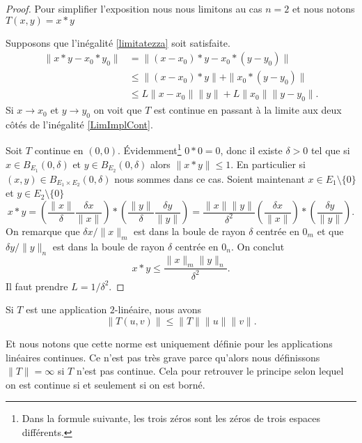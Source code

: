 \begin{proof}
	Pour simplifier l'exposition nous nous limitons au cas \( n=2\) et nous notons \( T(x,y)=x*y\)

	Supposons que l'inégalité \eqref{limitatezza} soit satisfaite.
	\begin{equation}\label{LimImplCont}
		\begin{aligned}
			\|x*y-x_0*y_0\| & =\|(x-x_0)*y-x_0*(y-y_0)\|                \\
			                & \leq \|(x-x_0)*y\|+\|x_0*(y-y_0)\|        \\
			                & \leq L\|x-x_0\|\|y\| + L\|x_0\|\|y-y_0\|.
		\end{aligned}
	\end{equation}
	Si \( x\to x_0\) et \( y\to y_0\)  on voit que \( T\) est continue en passant à la limite aux deux côtés de l'inégalité \eqref{LimImplCont}.

	Soit \( T\) continue en \( (0,0)\). Évidemment\footnote{Dans la formule suivante, les trois zéros sont les zéros de trois espaces différents.} \( 0*0=0\), donc il existe \( \delta>0\) tel que si \( x\in B_{E_1}(0,\delta)\) et \( y\in B_{E_2}(0,\delta)\) alors \( \|x*y\|\leq 1\). En particulier si \( (x,y)\in B_{E_1\times E_2}(0,\delta)\) nous sommes dans ce cas. Soient maintenant  \( x\in E_1\setminus\{ 0 \}\)  et \( y\in E_2\setminus\{ 0\}\)
	\begin{equation}
		x*y =\left(\frac{\|x\|}{\delta}\frac{\delta x}{\|x\|}\right)*\left(\frac{\|y\|}{\delta}\frac{\delta y}{\|y\|}\right)
		=\frac{\|x\|\|y\|}{\delta^2} \left(\frac{\delta x}{\|x\|}\right)*\left(\frac{\delta y}{\|y\|}\right).
	\end{equation}
	On remarque que \( \delta x/\|x\|_m\) est dans la boule de rayon \( \delta\) centrée en \( 0_m\) et que \( \delta y/\|y\|_n\) est dans la boule de rayon \( \delta\) centrée en \( 0_n\). On conclut
	\[
		x*y\leq \frac{\|x\|_m\|y\|_n}{\delta^2}.
	\]
	Il faut prendre \( L=1/\delta^2\).
\end{proof}

\begin{proposition}		\label{PROPooOPCVooEWeWha}
	Si \( T\) est une application \( 2\)-linéaire, nous avons
	\begin{equation}    \label{EqYLnbRbC}
		\| T(u,v) \|\leq \| T \|\| u \|\| v \|.
	\end{equation}
\end{proposition}

Et nous notons que cette norme est uniquement définie pour les applications linéaires continues. Ce n'est pas très grave parce qu'alors nous définissons \( \| T \|=\infty\) si \( T\) n'est pas continue. Cela pour retrouver le principe selon lequel on est continue si et seulement si on est borné.

